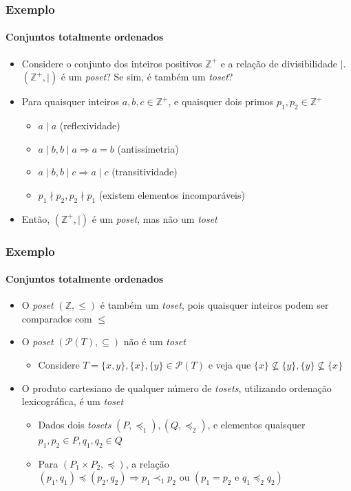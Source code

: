 \documentclass[12pt]{beamer}
\begin{document}
\begin{frame}
  \frametitle{Exemplo}
  \framesubtitle{Conjuntos totalmente ordenados}
  \begin{itemize}
    \item<1-> Considere o conjunto dos inteiros positivos $\mathbb{Z}^{+}$ e a
        relação de divisibilidade $\mid$. $(\mathbb{Z}^{+}, \mid)$ é um
          \emph{poset}? Se sim, é também um \emph{toset}?
    \item<2-> Para quaisquer inteiros $a, b, c \in \mathbb{Z}^{+}$, e quaisquer
        dois primos $p_1, p_2 \in \mathbb{Z}^{+}$
    \begin{itemize}[itemsep=0pt]
      \item<3-> $a \mid a$ (reflexividade)
      \item<4-> $a \mid b, b \mid a \Rightarrow a = b$ (antissimetria)
      \item<5-> $a \mid b, b \mid c \Rightarrow a \mid c$ (transitividade)
      \item<6-> $p_1 \nmid p_2, p_2 \nmid p_1$ (existem elementos incomparáveis)
    \end{itemize}
    \item<7-> Então, $(\mathbb{Z}^{+}, \mid)$ é um \emph{poset}, mas não um
        \emph{toset}
  \end{itemize}
\end{frame}

\begin{frame}
  \frametitle{Exemplo}
  \framesubtitle{Conjuntos totalmente ordenados}
  \begin{itemize}
    \item<1-> O \emph{poset} $(\mathbb{Z}, \leq)$ é também um \emph{toset},
        pois quaisquer inteiros podem ser comparados com $\leq$
    \item<2-> O \emph{poset} $(\mathcal{P}(T), \subseteq)$ não é um \emph{toset}
    \begin{itemize}
      \item Considere $T = \{x, y\}, \{x\}, \{y\} \in \mathcal{P}(T)$ e veja
          que $\{x\} \not\subseteq \{y\}, \{y\} \not\subseteq \{x\}$
    \end{itemize}
    \item<3-> O produto cartesiano de qualquer número de \emph{tosets},
        utilizando ordenação lexicográfica, é um \emph{toset}
    \begin{itemize}[itemsep=0pt]
      \item Dados dois \emph{tosets} $(P, \preccurlyeq_1), (Q,
          \preccurlyeq_2)$, e elementos quaisquer $p_1, p_2 \in P, q_1, q_2 \in
            Q$
      \item Para $(P_1 \times P_2, \preccurlyeq)$, a relação $(p_1, q_1)
          \preccurlyeq (p_2, q_2) \Rightarrow p_1 \prec_1 p_2 \text{ ou } (p_1
            = p_2 \text{ e } q_1 \preccurlyeq_2 q_2)$
    \end{itemize}
  \end{itemize}
\end{frame}
\end{document}
